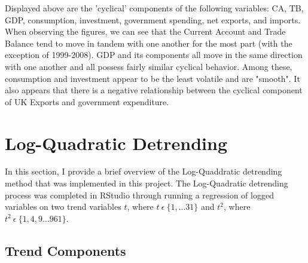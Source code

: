 \documentclass[12pt]{article}
\begin{document}
\begin{flushleft}
Displayed above are the 'cyclical' components of the following variables: CA, TB, GDP, consumption, investment, government spending, net exports, and imports. 
\break
\linebreak
When observing the figures, we can see that the Current Account and Trade Balance tend to move in tandem with one another for the most part (with the exception of 1999-2008). 
\break
\linebreak
GDP and its components all move in the same direction with one another and all possess fairly similar cyclical behavior. Among these, consumption and investment appear to be the least volatile and are "smooth". It also appears that there is a negative relationship between the cyclical component of UK Exports and government expenditure.
\end{flushleft}

\newpage

\section{Log-Quadratic Detrending}

In this section, I provide a brief overview of the Log-Quaddratic detrending method that was implemented in this project. The Log-Quadratic detrending process was completed in RStudio through running a regression of logged variables on two trend variables $t$, where $t \ \epsilon \ \{1,...31\}$ and $t^2$, where $t^2 \ \epsilon \ \{1,4,9...961\}$.

\subsection{Trend Components}
\end{document}
